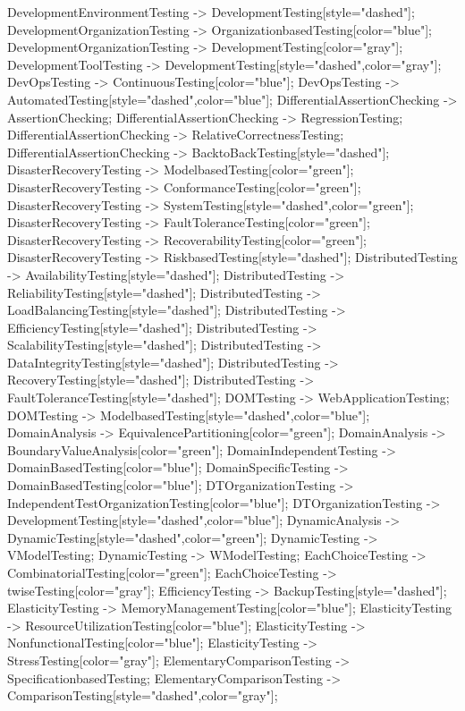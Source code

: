 \documentclass{article}
\begin{document}
{DevelopmentEnvironmentTesting -> DevelopmentTesting[style="dashed"];
DevelopmentOrganizationTesting -> OrganizationbasedTesting[color="blue"];
DevelopmentOrganizationTesting -> DevelopmentTesting[color="gray"];
DevelopmentToolTesting -> DevelopmentTesting[style="dashed",color="gray"];
DevOpsTesting -> ContinuousTesting[color="blue"];
DevOpsTesting -> AutomatedTesting[style="dashed",color="blue"];
DifferentialAssertionChecking -> AssertionChecking;
DifferentialAssertionChecking -> RegressionTesting;
DifferentialAssertionChecking -> RelativeCorrectnessTesting;
DifferentialAssertionChecking -> BacktoBackTesting[style="dashed"];
DisasterRecoveryTesting -> ModelbasedTesting[color="green"];
DisasterRecoveryTesting -> ConformanceTesting[color="green"];
DisasterRecoveryTesting -> SystemTesting[style="dashed",color="green"];
DisasterRecoveryTesting -> FaultToleranceTesting[color="green"];
DisasterRecoveryTesting -> RecoverabilityTesting[color="green"];
DisasterRecoveryTesting -> RiskbasedTesting[style="dashed"];
DistributedTesting -> AvailabilityTesting[style="dashed"];
DistributedTesting -> ReliabilityTesting[style="dashed"];
DistributedTesting -> LoadBalancingTesting[style="dashed"];
DistributedTesting -> EfficiencyTesting[style="dashed"];
DistributedTesting -> ScalabilityTesting[style="dashed"];
DistributedTesting -> DataIntegrityTesting[style="dashed"];
DistributedTesting -> RecoveryTesting[style="dashed"];
DistributedTesting -> FaultToleranceTesting[style="dashed"];
DOMTesting -> WebApplicationTesting;
DOMTesting -> ModelbasedTesting[style="dashed",color="blue"];
DomainAnalysis -> EquivalencePartitioning[color="green"];
DomainAnalysis -> BoundaryValueAnalysis[color="green"];
DomainIndependentTesting -> DomainBasedTesting[color="blue"];
DomainSpecificTesting -> DomainBasedTesting[color="blue"];
DTOrganizationTesting -> IndependentTestOrganizationTesting[color="blue"];
DTOrganizationTesting -> DevelopmentTesting[style="dashed",color="blue"];
DynamicAnalysis -> DynamicTesting[style="dashed",color="green"];
DynamicTesting -> VModelTesting;
DynamicTesting -> WModelTesting;
EachChoiceTesting -> CombinatorialTesting[color="green"];
EachChoiceTesting -> twiseTesting[color="gray"];
EfficiencyTesting -> BackupTesting[style="dashed"];
ElasticityTesting -> MemoryManagementTesting[color="blue"];
ElasticityTesting -> ResourceUtilizationTesting[color="blue"];
ElasticityTesting -> NonfunctionalTesting[color="blue"];
ElasticityTesting -> StressTesting[color="gray"];
ElementaryComparisonTesting -> SpecificationbasedTesting;
ElementaryComparisonTesting -> ComparisonTesting[style="dashed",color="gray"];
}
\end{document}
